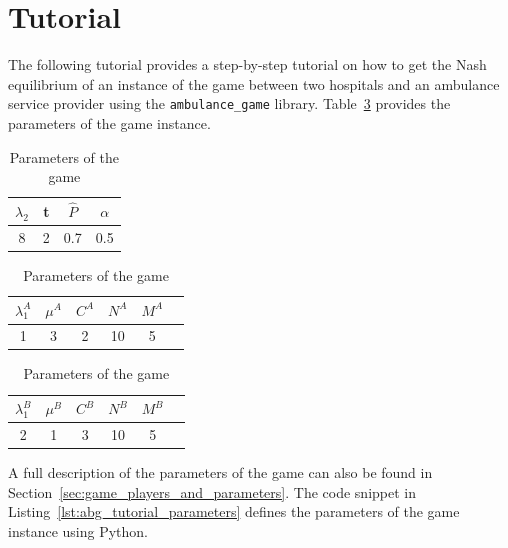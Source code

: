 \section{Tutorial}\label{sec:ambulance_game_tutorial}

The following tutorial provides a step-by-step tutorial on how to get the Nash
equilibrium of an instance of the game between two hospitals and an ambulance
service provider using the \texttt{ambulance\_game} library.
Table~\ref{tab:ambulance_game_example} provides the parameters of the game
instance.

\begin{table}[H]
    \begin{center}
        \begin{tabular}{||c|c|c|c||}
            \hline
            \(\lambda_2\) & t & \footnotesize{\(\hat{P}\)} & \(\alpha\) \\
            \hline\hline
            8 & 2 & 0.7 & 0.5 \\
            \hline
        \end{tabular}

        \vspace{0.3cm}

        \begin{tabular}{||c|c|c|c|c|c||}
            \hline
            \(\lambda_1^A\) & \(\mu^A\) & \(C^A\) & \(N^A\) & \(M^A\) \\
            \hline\hline
            1 & 3 & 2 & 10 & 5 \\
            \hline
        \end{tabular}

        \vspace{0.3cm}
        
        \begin{tabular}{||c|c|c|c|c|c||}
            \hline
            \(\lambda_1^B\) & \(\mu^B\) & \(C^B\) & \(N^B\) & \(M^B\) \\
            \hline\hline
            2 & 1 & 3 & 10 & 5 \\
            \hline
        \end{tabular}
    \end{center}
    \caption{Parameters of the game}
    \label{tab:ambulance_game_example}
\end{table}

A full description of the parameters of the game can also be found in
Section~\ref{sec:game_players_and_parameters}.
The code snippet in Listing~\ref{lst:abg_tutorial_parameters} defines the
parameters of the game instance using Python.

